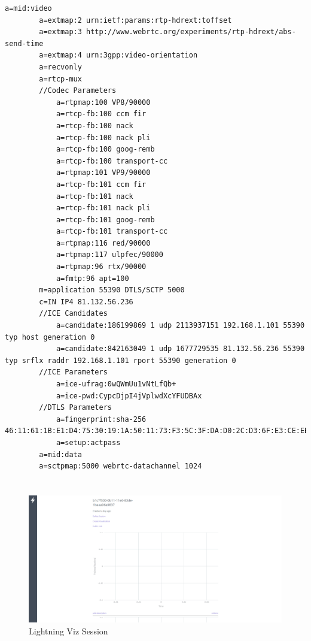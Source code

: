 \documentclass[]{report}
\begin{document}
\begin{lstlisting}[tabsize=1,frame=single, basicstyle=\ttfamily\footnotesize, breaklines=true]
		a=mid:video
		a=extmap:2 urn:ietf:params:rtp-hdrext:toffset
		a=extmap:3 http://www.webrtc.org/experiments/rtp-hdrext/abs-send-time
		a=extmap:4 urn:3gpp:video-orientation
		a=recvonly
		a=rtcp-mux
		//Codec Parameters
			a=rtpmap:100 VP8/90000
			a=rtcp-fb:100 ccm fir
			a=rtcp-fb:100 nack
			a=rtcp-fb:100 nack pli
			a=rtcp-fb:100 goog-remb
			a=rtcp-fb:100 transport-cc
			a=rtpmap:101 VP9/90000
			a=rtcp-fb:101 ccm fir
			a=rtcp-fb:101 nack
			a=rtcp-fb:101 nack pli
			a=rtcp-fb:101 goog-remb
			a=rtcp-fb:101 transport-cc
			a=rtpmap:116 red/90000
			a=rtpmap:117 ulpfec/90000
			a=rtpmap:96 rtx/90000
			a=fmtp:96 apt=100
		m=application 55390 DTLS/SCTP 5000
		c=IN IP4 81.132.56.236
		//ICE Candidates
			a=candidate:186199869 1 udp 2113937151 192.168.1.101 55390 typ host generation 0
			a=candidate:842163049 1 udp 1677729535 81.132.56.236 55390 typ srflx raddr 192.168.1.101 rport 55390 generation 0
		//ICE Parameters
			a=ice-ufrag:0wQWmUu1vNtLfQb+
			a=ice-pwd:CypcDjpI4jVplwdXcYFUDBAx
		//DTLS Parameters
			a=fingerprint:sha-256 46:11:61:1B:E1:D4:75:30:19:1A:50:11:73:F3:5C:3F:DA:D0:2C:D3:6F:E3:CE:EB:1E:13:94:12:00:71:51:60
			a=setup:actpass
		a=mid:data
		a=sctpmap:5000 webrtc-datachannel 1024
	\end{lstlisting}	
	
	\chapter{}
	\begin{figure}[H]
		\caption{Lightning Viz Session}
		\centering
		\includegraphics[scale=0.25]{lightning-viz.png}
	\end{figure}
	
\end{document}
